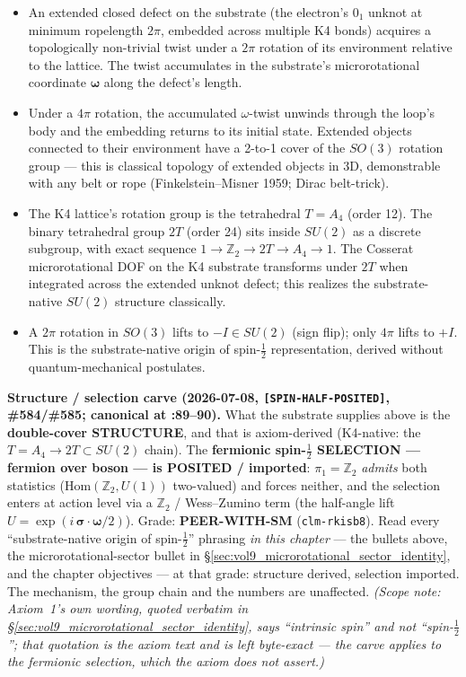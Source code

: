 \begin{itemize}
    \item An extended closed defect on the substrate (the electron's $0_1$ unknot at minimum ropelength $2\pi$, embedded across multiple K4 bonds) acquires a topologically non-trivial twist under a $2\pi$ rotation of its environment relative to the lattice. The twist accumulates in the substrate's microrotational coordinate $\boldsymbol{\omega}$ along the defect's length.
    \item Under a $4\pi$ rotation, the accumulated $\omega$-twist unwinds through the loop's body and the embedding returns to its initial state. Extended objects connected to their environment have a 2-to-1 cover of the $SO(3)$ rotation group --- this is classical topology of extended objects in 3D, demonstrable with any belt or rope (Finkelstein--Misner 1959; Dirac belt-trick).
    \item The K4 lattice's rotation group is the tetrahedral $T = A_4$ (order 12). The binary tetrahedral group $2T$ (order 24) sits inside $SU(2)$ as a discrete subgroup, with exact sequence $1 \to \mathbb{Z}_2 \to 2T \to A_4 \to 1$. The Cosserat microrotational DOF on the K4 substrate transforms under $2T$ when integrated across the extended unknot defect; this realizes the substrate-native $SU(2)$ structure classically.
    \item A $2\pi$ rotation in $SO(3)$ lifts to $-I \in SU(2)$ (sign flip); only $4\pi$ lifts to $+I$. This is the substrate-native origin of spin-$\tfrac{1}{2}$ representation, derived without quantum-mechanical postulates.
\end{itemize}

\noindent\textbf{Structure / selection carve (2026-07-08, \texttt{[SPIN-HALF-POSITED]}, \#584/\#585; canonical at :89--90).} What the substrate supplies above is the \textbf{double-cover STRUCTURE}, and that is axiom-derived (K4-native: the $T = A_4 \to 2T \subset SU(2)$ chain). The \textbf{fermionic spin-$\tfrac{1}{2}$ SELECTION --- fermion over boson --- is POSITED / imported}: $\pi_1 = \mathbb{Z}_2$ \emph{admits} both statistics ($\mathrm{Hom}(\mathbb{Z}_2, U(1))$ two-valued) and forces neither, and the selection enters at action level via a $\mathbb{Z}_2$ / Wess--Zumino term (the half-angle lift $U = \exp(i\,\boldsymbol{\sigma}\cdot\boldsymbol{\omega}/2)$). Grade: \textbf{PEER-WITH-SM} (\texttt{clm-rkisb8}). Read every ``substrate-native origin of spin-$\tfrac{1}{2}$'' phrasing \emph{in this chapter} --- the bullets above, the microrotational-sector bullet in \S\ref{sec:vol9_microrotational_sector_identity}, and the chapter objectives --- at that grade: structure derived, selection imported. The mechanism, the group chain and the numbers are unaffected. \emph{(Scope note: Axiom~1's own wording, quoted verbatim in \S\ref{sec:vol9_microrotational_sector_identity}, says ``intrinsic spin'' and not ``spin-$\tfrac{1}{2}$''; that quotation is the axiom text and is left byte-exact --- the carve applies to the fermionic \emph{selection}, which the axiom does not assert.)}

